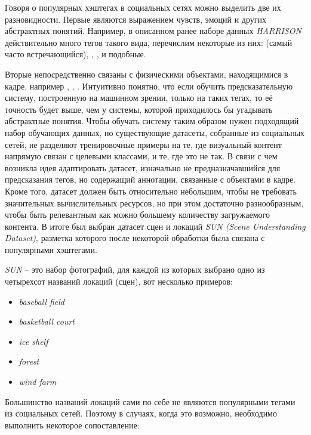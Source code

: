 \indent
\indent
Говоря о популярных хэштегах в социальных сетях можно выделить две 
их разновидности.
Первые являются выражением чувств, эмоций и других абстрактных понятий.
Например, в описанном ранее наборе данных \textit{HARRISON} 
действительно много тегов такого вида, перечислим некоторые из них: 
 (самый часто встречающийся), , ,
 и подобные.

\indent
\indent
Вторые непосредственно
связаны с физическими объектами, находящимися в кадре, например  
, , . 
Интуитивно понятно, что если обучить предсказательную систему,
построенную на машинном зрении, только на таких тегах, то
её точность будет выше, чем у системы, которой приходилось бы угадывать
абстрактные понятия. Чтобы обучать систему таким образом
нужен подходящий набор обучающих данных, но существующие датасеты, 
собранные из социальных сетей, не разделяют тренировочные примеры на те, 
где визуальный контент напрямую связан с целевыми классами, и те, где это не так.
В связи с чем возникла идея 
адаптировать датасет, изначально не предназначавшийся для предсказания
тегов, но содержащий аннотации, связанные с объектами
в кадре. Кроме того, датасет должен быть относительно небольшим,
чтобы не требовать значительных 
вычислительных ресурсов, но при этом достаточно разнообразным, чтобы 
быть релевантным как можно большему количеству загружаемого контента.
В итоге был выбран датасет сцен и локаций 
\textit{SUN\cite{sundata} (Scene Understanding Dataset)}, 
разметка которого после некоторой обработки была
связана с популярными хэштегами.

\indent
\indent  
\textit{SUN} -- это набор фотографий, для каждой из которых выбрано одно
 из четырехсот названий локаций (сцен), вот несколько примеров:
  
  
\begin{itemize}
    \item \textit{baseball field}
    \item \textit{basketball court}
    \item \textit{ice shelf}
    \item \textit{forest}
    \item \textit{wind farm}
\end{itemize}


\indent
\indent
Большинство названий локаций сами по себе не являются популярными 
тегами из социальных сетей. Поэтому в случаях, когда это возможно, необходимо
выполнить некоторое сопоставление:


